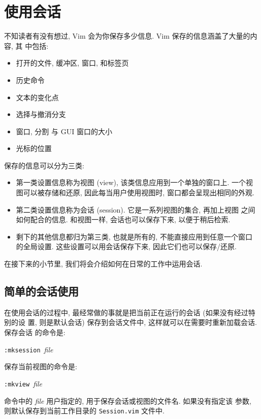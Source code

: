 \section{使用会话}
\label{sec:using_sessions}

不知读者有没有想过, Vim 会为你保存多少信息. Vim 保存的信息涵盖了大量的内容, 其
中包括:
\begin{itemize}
    \item 打开的文件, 缓冲区, 窗口, 和标签页
    \item 历史命令
    \item 文本的变化点
    \item 选择与撤消分支
    \item 窗口, 分割 与 GUI 窗口的大小
    \item 光标的位置
\end{itemize}

保存的信息可以分为三类:
\begin{itemize}
    \item 第一类设置信息称为视图 (view), 该类信息应用到一个单独的窗口上. 一个视
        图可以被存储和还原, 因此每当用户使用视图时, 窗口都会呈现出相同的外观.
    \item 第二类设置信息称为会话 (session). 它是一系列视图的集合, 再加上视图
        之间如何配合的信息. 和视图一样, 会话也可以保存下来, 以便于稍后检索.
    \item 剩下的其他信息都归为第三类, 也就是所有的, 不能直接应用到任意一个窗口
        的全局设置. 这些设置可以用会话保存下来, 因此它们也可以保存/还原.
\end{itemize}

在接下来的小节里, 我们将会介绍如何在日常的工作中运用会话.

\subsection{简单的会话使用}
\label{subsec:simple_session_usage}

在使用会话的过程中, 最经常做的事就是把当前正在运行的会话 (如果没有经过特别的设
置, 则是默认会话) 保存到会话文件中, 这样就可以在需要时重新加载会话. 保存会话
的命令是:
\begin{vimcmdform}
\texttt{:mksession}\ \textit{file}
\end{vimcmdform}
保存当前视图的命令是:
\begin{vimcmdform}
\texttt{:mkview}\ \textit{file}
\end{vimcmdform}
命令中的 \textit{file} 用户指定的, 用于保存会话或视图的文件名. 如果没有指定该
参数, 则默认保存到当前工作目录的 \texttt{Session.vim} 文件中.

